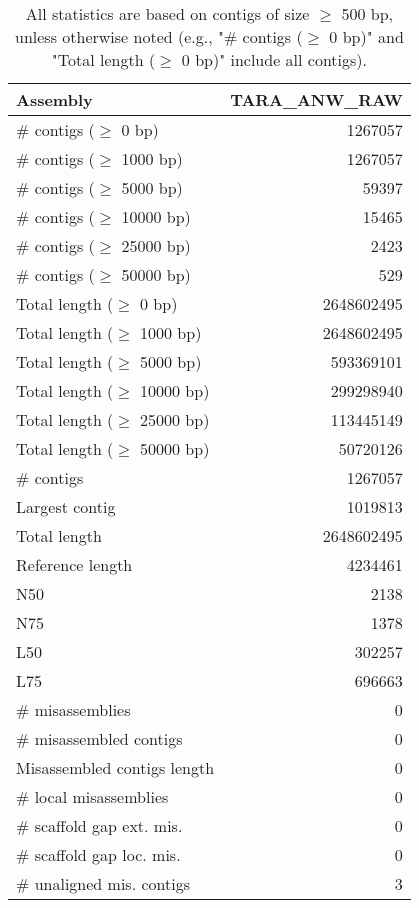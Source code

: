 \documentclass[12pt,a4paper]{article}
\begin{document}
\begin{table}[ht]
\begin{center}
\caption{All statistics are based on contigs of size $\geq$ 500 bp, unless otherwise noted (e.g., "\# contigs ($\geq$ 0 bp)" and "Total length ($\geq$ 0 bp)" include all contigs).}
\begin{tabular}{|l*{1}{|r}|}
\hline
Assembly & TARA\_ANW\_RAW \\ \hline
\# contigs ($\geq$ 0 bp) & 1267057 \\ \hline
\# contigs ($\geq$ 1000 bp) & 1267057 \\ \hline
\# contigs ($\geq$ 5000 bp) & 59397 \\ \hline
\# contigs ($\geq$ 10000 bp) & 15465 \\ \hline
\# contigs ($\geq$ 25000 bp) & 2423 \\ \hline
\# contigs ($\geq$ 50000 bp) & 529 \\ \hline
Total length ($\geq$ 0 bp) & 2648602495 \\ \hline
Total length ($\geq$ 1000 bp) & 2648602495 \\ \hline
Total length ($\geq$ 5000 bp) & 593369101 \\ \hline
Total length ($\geq$ 10000 bp) & 299298940 \\ \hline
Total length ($\geq$ 25000 bp) & 113445149 \\ \hline
Total length ($\geq$ 50000 bp) & 50720126 \\ \hline
\# contigs & 1267057 \\ \hline
Largest contig & 1019813 \\ \hline
Total length & 2648602495 \\ \hline
Reference length & 4234461 \\ \hline
N50 & 2138 \\ \hline
N75 & 1378 \\ \hline
L50 & 302257 \\ \hline
L75 & 696663 \\ \hline
\# misassemblies & 0 \\ \hline
\# misassembled contigs & 0 \\ \hline
Misassembled contigs length & 0 \\ \hline
\# local misassemblies & 0 \\ \hline
\# scaffold gap ext. mis. & 0 \\ \hline
\# scaffold gap loc. mis. & 0 \\ \hline
\# unaligned mis. contigs & 3 \\ \hline

\end{tabular}
\end{center}
\end{table}
\end{document}
